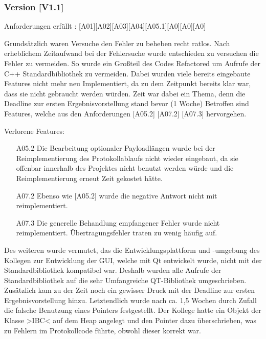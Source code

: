 \begin{itemize}
\begin{center}
\begin{center}
\subsubsection{Version [V1.1]}

Anforderungen  erfüllt : [A01][A02][A03][A04][A05.1][A0][A0][A0]









Grundsätzlich waren Versuche den Fehler zu beheben recht ratlos.
Nach erheblichem Zeitaufwand bei der Fehlersuche wurde entschieden zu versuchen die Fehler zu vermeiden. So wurde ein Großteil des Codes Refactored um Aufrufe der C++ Standardbibliothek zu vermeiden. Dabei wurden viele bereits eingebaute Features nicht mehr neu Implementiert, da zu dem Zeitpunkt bereits klar war, dass sie nicht gebraucht werden würden. Zeit war dabei ein Thema, denn die Deadline zur ersten Ergebnisvorstellung stand bevor (1 Woche) Betroffen sind Features, welche aus den Anforderungen [A05.2] [A07.2] [A07.3]
	hervorgehen.

	Verlorene Features:
	\begin{itemize}
		\item [A05.2] Die Bearbeitung optionaler Payloadlängen wurde bei der Reimplementierung des Protokollablaufs nicht wieder eingebaut, da sie offenbar innerhalb des Projektes nicht benutzt werden würde und die Reimplementierung erneut Zeit gekostet hätte.
		\item [A07.2] Ebenso wie [A05.2] wurde die negative Antwort nicht mit reimplementiert.
		\item [A07.3] Die generelle Behandlung empfangener Fehler wurde nicht reimplementiert. Übertragungsfehler traten zu wenig häufig auf.
	\end{itemize}

Des weiteren wurde vermutet, das die Entwicklungsplattform und -umgebung des Kollegen zur Entwicklung der GUI, welche mit Qt entwickelt wurde, nicht mit der Standardbibliothek kompatibel war. Deshalb wurden alle Aufrufe der Standardbibliothek auf die sehr Umfangreiche QT-Bibliothek umgeschrieben.
Zusätzlich kam zu der Zeit noch ein gewisser Druck mit der Deadline zur ersten Ergebnisvorstellung hinzu.
Letztendlich wurde nach ca. 1,5 Wochen durch Zufall die falsche Benutzung eines Pointers festgestellt. Der Kollege hatte ein Objekt der Klasse >IBC< auf dem Heap angelegt und den Pointer dazu überschrieben, was zu Fehlern im Protokollcode führte, obwohl dieser korrekt war.


\end{center}
\end{center}
\end{itemize}
